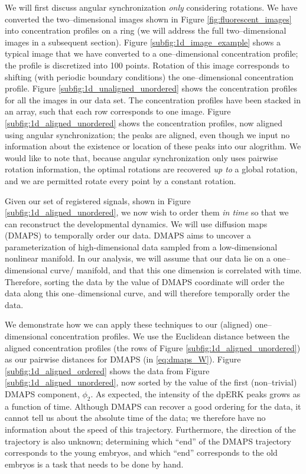 \documentclass{pnastwo}
\begin{document}
\begin{article}
We will first discuss angular synchronization {\em only} considering rotations. 
%
We have converted the two--dimensional images shown in Figure \ref{fig:fluorescent_images} into concentration profiles on a ring (we will address the full two--dimensional images in a subsequent section).
%
Figure \ref{subfig:1d_image_example} shows a typical image that we have converted to a one--dimensional concentration profile; the profile is discretized into 100 points. 
%
Rotation of this image corresponds to shifting (with periodic boundary conditions) the one--dimensional concentration profile. 
%
Figure \ref{subfig:1d_unaligned_unordered} shows the concentration profiles for all the images in our data set. 
%
The concentration profiles have been stacked in an array, such that each row corresponds to one image.
%
Figure \ref{subfig:1d_aligned_unordered} shows the concentration profiles, now aligned using angular synchronization;
the peaks are aligned, even though we input no information about the existence or location of these peaks into our alogrithm.
%
We would like to note that, because angular synchronization only uses pairwise rotation information, the optimal rotations are recovered {\em up to} a global rotation, and we are permitted rotate every point by a constant rotation.

Given our set of registered signals, shown in Figure \ref{subfig:1d_aligned_unordered}, we now wish to order them {\em in time} so that we can reconstruct the developmental dynamics.
%
We will use diffusion maps (DMAPS) \cite{coifman2005geometric} to temporally order our data.
%
DMAPS aims to uncover a parameterization of high-dimensional data sampled from a low-dimensional nonlinear manifold.
%
In our analysis, we will assume that our data lie on a one--dimensional curve/ manifold, and that this one dimension is correlated with time. 
%
Therefore, sorting the data by the value of DMAPS coordinate will order the data along this one--dimensional curve, and will therefore temporally order the data.

We demonstrate how we can apply these techniques to our (aligned) one--dimensional concentration profiles. 
%
We use the Euclidean distance between the aligned concentration profiles (the rows of Figure \ref{subfig:1d_aligned_unordered}) as our pairwise distances for DMAPS (in \eqref{eq:dmaps_W}).
%
Figure \ref{subfig:1d_aligned_ordered} shows the data from Figure \ref{subfig:1d_aligned_unordered}, now sorted by the value of the first (non--trivial) DMAPS component, $\phi_2$. 
%
As expected, the intensity of the dpERK peaks grows as a function of time. 
%
Although DMAPS can recover a good ordering for the data, it cannot tell us about the absolute time of the data; we therefore have no information about the speed of this trajectory.
%
Furthermore, the direction of the trajectory is also unknown; determining which ``end'' of the DMAPS trajectory corresponds to the young embryos, and which ``end'' corresponds to the old embryos is a task that needs to be done by hand.


\end{article}
\end{document}
